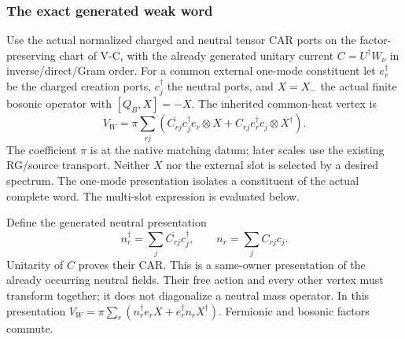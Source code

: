 \documentclass[12pt,a4paper]{article}
\begin{document}
\subsubsection{The exact generated weak word}
Use the actual normalized charged and neutral tensor CAR ports on the
factor-preserving chart of V-C, with the already generated unitary current
$C=U^\dagger W_\nu$ in inverse/direct/Gram order. For a common external
one-mode constituent let $e_r^\dagger$ be the charged creation ports,
$c_j^\dagger$ the neutral ports, and $X=X_-$ the actual finite bosonic
operator with $[Q_B,X]=-X$. The inherited common-heat vertex is
\begin{equation}
 V_W=\pi\sum_{rj}
   \left(\overline{C_{rj}}c_j^\dagger e_r\otimes X
       +C_{rj}e_r^\dagger c_j\otimes X^\dagger\right).
 \label{p5c:eq:v2169-b8-w1}
\end{equation}
The coefficient $\pi$ is at the native matching datum; later scales use the
existing RG/source transport. Neither $X$ nor the external slot is selected
by a desired spectrum. The one-mode presentation isolates a constituent of
the actual complete word. The multi-slot expression is evaluated below.

Define the generated neutral presentation
\[
 n_r^\dagger=\sum_j\overline{C_{rj}}c_j^\dagger,
 \qquad n_r=\sum_j C_{rj}c_j.
\]
Unitarity of $C$ proves their CAR. This is a same-owner presentation of the
already occurring neutral fields. Their free action and every other vertex
must transform together; it does not diagonalize a neutral mass operator.
In this presentation $V_W=\pi\sum_r(n_r^\dagger e_rX+
e_r^\dagger n_rX^\dagger)$. Fermionic and bosonic factors commute.
\end{document}
